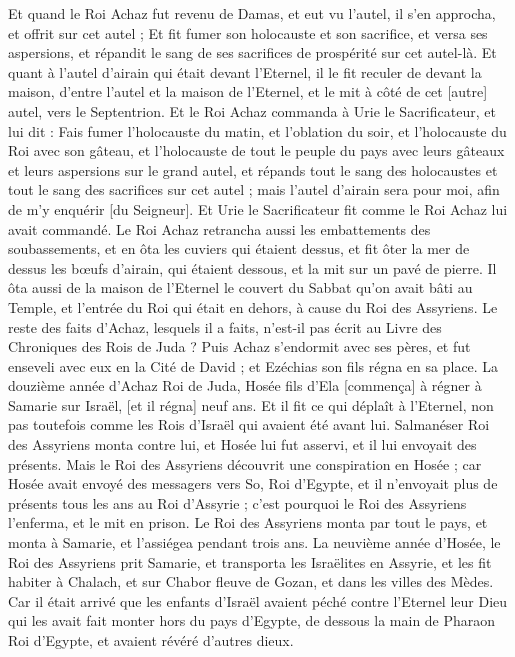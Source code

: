 \begin{multicols}{2}
Et quand le Roi Achaz fut revenu de Damas, et eut vu l'autel, il s'en approcha, et offrit sur cet autel ;
Et fit fumer son holocauste et son sacrifice, et versa ses aspersions, et répandit le sang de ses sacrifices de prospérité sur cet autel-là.
Et quant à l'autel d'airain qui était devant l'Eternel, il le fit reculer de devant la maison, d'entre l'autel et la maison de l'Eternel, et le mit à côté de cet [autre] autel, vers le Septentrion.
Et le Roi Achaz commanda à Urie le Sacrificateur, et lui dit : Fais fumer l'holocauste du matin, et l'oblation du soir, et l'holocauste du Roi avec son gâteau, et l'holocauste de tout le peuple du pays avec leurs gâteaux et leurs aspersions sur le grand autel, et répands tout le sang des holocaustes et tout le sang des sacrifices sur cet autel ; mais l'autel d'airain sera pour moi, afin de m'y enquérir [du Seigneur].
Et Urie le Sacrificateur fit comme le Roi Achaz lui avait commandé.
Le Roi Achaz retrancha aussi les embattements des soubassements, et en ôta les cuviers qui étaient dessus, et fit ôter la mer de dessus les bœufs d'airain, qui étaient dessous, et la mit sur un pavé de pierre.
Il ôta aussi de la maison de l'Eternel le couvert du Sabbat qu'on avait bâti au Temple, et l'entrée du Roi qui était en dehors, à cause du Roi des Assyriens.
Le reste des faits d'Achaz, lesquels il a faits, n'est-il pas écrit au Livre des Chroniques des Rois de Juda ?
Puis Achaz s'endormit avec ses pères, et fut enseveli avec eux en la Cité de David ; et Ezéchias son fils régna en sa place.
\VerseOne{}La douzième année d'Achaz Roi de Juda, Hosée fils d'Ela [commença] à régner à Samarie sur Israël, [et il régna] neuf ans.
Et il fit ce qui déplaît à l'Eternel, non pas toutefois comme les Rois d'Israël qui avaient été avant lui.
Salmanéser Roi des Assyriens monta contre lui, et Hosée lui fut asservi, et il lui envoyait des présents.
Mais le Roi des Assyriens découvrit une conspiration en Hosée ; car Hosée avait envoyé des messagers vers So, Roi d'Egypte, et il n'envoyait plus de présents tous les ans au Roi d'Assyrie ; c'est pourquoi le Roi des Assyriens l'enferma, et le mit en prison.
Le Roi des Assyriens monta par tout le pays, et monta à Samarie, et l'assiégea pendant trois ans.
La neuvième année d'Hosée, le Roi des Assyriens prit Samarie, et transporta les Israëlites en Assyrie, et les fit habiter à Chalach, et sur Chabor fleuve de Gozan, et dans les villes des Mèdes.
Car il était arrivé que les enfants d'Israël avaient péché contre l'Eternel leur Dieu qui les avait fait monter hors du pays d'Egypte, de dessous la main de Pharaon Roi d'Egypte, et avaient révéré d'autres dieux.

\end{multicols}

